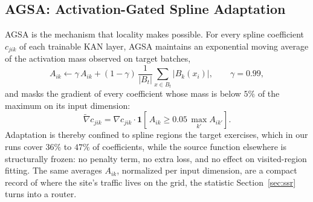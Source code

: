 \documentclass[10pt, conference, letterpaper]{IEEEtran}
\begin{document}
\subsection{AGSA: Activation-Gated Spline Adaptation}
\label{sec:method-agsa}
AGSA is the mechanism that locality makes possible. For every spline
coefficient $c_{jik}$ of each trainable KAN layer, AGSA maintains an
exponential moving average of the activation mass observed on target
batches,
\begin{equation}
A_{ik} \leftarrow \gamma\, A_{ik} + (1-\gamma)\,
\frac{1}{|B_t|}\sum_{x \in B_t} \big|B_k(x_i)\big|,
\qquad \gamma = 0.99,
\label{eq:ema}
\end{equation}
and masks the gradient of every coefficient whose mass is below $5\%$
of the maximum on its input dimension:
\begin{equation}
\tilde{\nabla} c_{jik} = \nabla c_{jik}\cdot
\mathbf{1}\!\left[\,A_{ik} \geq 0.05\,
\max_{k'} A_{ik'}\right].
\label{eq:agsa}
\end{equation}
Adaptation is thereby confined to spline regions the target
exercises, which in our runs cover $36\%$ to $47\%$ of coefficients,
while the source function elsewhere is structurally frozen: no penalty
term, no extra loss, and no effect on visited-region fitting. The same
averages $A_{ik}$, normalized per input dimension, are a compact
record of where the site's traffic lives on the grid, the statistic
Section~\ref{sec:ssr} turns into a router.
\end{document}
